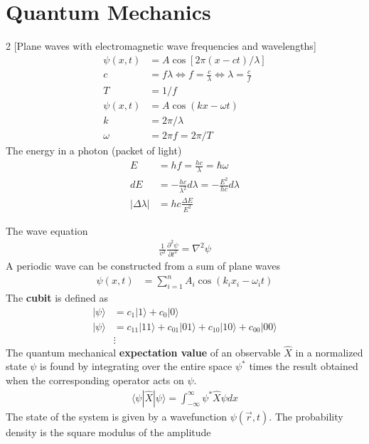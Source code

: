 \chapter{Quantum Mechanics}
\thispagestyle{fancy}
\begin{multicols}{2}
[Plane waves with electromagnetic wave frequencies and wavelengths]
	\noindent
	\begin{align}
		\psi(x,t) &=A\cos[2\pi(x-ct)/\lambda] \\
		c &= f \lambda \Longleftrightarrow f = \frac{c}{\lambda} \Longleftrightarrow \lambda = \frac{c}{f} \\
		T &=1/f \\
		\psi(x,t) &= A \cos(kx-\omega t) \\
		k &= 2\pi /\lambda \\
		\omega &= 2\pi f = 2 \pi /T
	\end{align}
	The energy in a photon (packet of light)
	\begin{align}
		E &=h f  = \frac{hc}{\lambda} = \hbar \omega \\
		dE &= -\frac{hc}{\lambda^2}d\lambda=-\frac{E^2}{hc}d\lambda \\ |\Delta \lambda | &= hc\frac{\Delta E}{E^2}
	\end{align}
\end{multicols}
The wave equation
\begin{align}
	\frac{1}{v^2}\frac{\partial^2 \psi}{\partial t^2} = \nabla^2\psi
\end{align}
A periodic wave can be constructed from a sum of plane waves
\begin{align}
	\psi(x,t) &= \sum_{i=1}^{n} A_i \cos(k_ix_i-\omega_i t) 
\end{align}
The \textbf{cubit} is defined as
\begin{align}
	|\psi\rangle &= c_1|1\rangle + c_0|0\rangle \\
	|\psi\rangle &= c_{11}|11\rangle+c_{01}|01\rangle+c_{10}|10\rangle+c_{00}|00\rangle \\
	&\vdots \nonumber
\end{align}
The quantum mechanical \textbf{expectation value} of an observable $\hat{X}$ in a normalized state $\psi$ is found by integrating over the entire space $\psi^*$ times the result obtained when the corresponding operator  acts on $\psi$. 
\begin{align}
	\langle \psi | \hat{X} | \psi \rangle = \int_{-\infty}^{\infty}\psi^* \hat{X}\psi dx
\end{align}
The state of the system is given by a wavefunction $\psi(\vec{r},t)$.  The probability density is the square modulus of the amplitude

